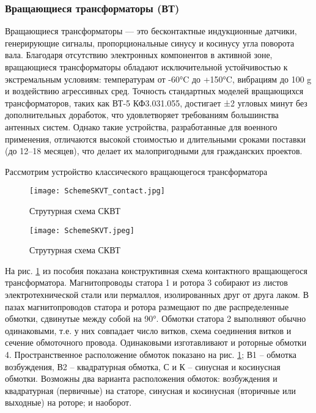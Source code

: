 \subsubsection{Вращающиеся трансформаторы (ВТ)}

Вращающиеся трансформаторы — это бесконтактные индукционные датчики, генерирующие сигналы, пропорциональные синусу и косинусу угла поворота вала. 
Благодаря отсутствию электронных компонентов в активной зоне, вращающиеся трансформаторы обладают исключительной устойчивостью к экстремальным условиям: температурам от -60°C до +150°C, 
вибрациям до 100 g и воздействию агрессивных сред.
Точность стандартных моделей вращающихся трансформаторов, таких как ВТ-5 КФ3.031.055, достигает ±2 угловых минут без дополнительных доработок, 
что удовлетворяет требованиям большинства антенных систем. 
Однако такие устройства, разработанные для военного применения, отличаются высокой стоимостью и длительными сроками поставки (до 12–18 месяцев), 
что делает их малопригодными для гражданских проектов.

Рассмотрим устройство классического вращающегося трансформатора

\begin{figure}[!t]
  \centering
  \texttt{[image: SchemeSKVT\_contact.jpg]}
  \caption{Струтурная схема СКВТ}
  \label{SchemeSKVT_Contact}
\end{figure}

\begin{figure}[!t]
  \centering
  \texttt{[image: SchemeSKVT.jpeg]}
  \caption{Струтурная схема СКВТ}
  \label{SchemeSKVT}
\end{figure}

На рис. \ref{SchemeSKVT_Contact} из пособия \cite{AutoDevices} показана конструктивная схема контактного вращающегося трансформатора. 
Магнитопроводы статора 1 и ротора 3 собирают из листов электротехнической стали или пермаллоя, 
изолированных друг от друга лаком. В пазах магнитопроводов статора и ротора размещают по две распределенные обмотки, сдвинутые между собой на 90°. 
Обмотки статора 2 выполняют обычно одинаковыми, т.е. у них совпадает число витков, схема соединения витков и сечение обмоточного провода. 
Одинаковыми изготавливают и роторные обмотки 4. Пространственное расположение обмоток показано на рис. \ref{SchemeSKVT_Contact}; В1 – обмотка возбуждения, В2 – квадратурная обмотка, 
С и К – синусная и косинусная обмотки. Возможны два варианта расположения обмоток: возбуждения и квадратурная (первичные) на статоре, 
синусная и косинусная (вторичные или выходные) на роторе; и наоборот. 

